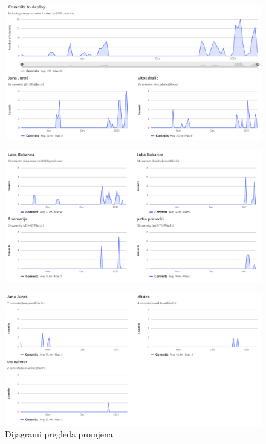 		\begin{figure}[H]
			\hspace*{-0.54in}
			\includegraphics[scale=0.43]{dijagrami/Dijagram pregleda promjena1.png}
			\label{fig:Dijagram pregleda promjena 1}
			\centering
		\end{figure}
	
		\begin{figure}[H]
			\hspace*{-0.54in}
			\includegraphics[scale=0.43]{dijagrami/Dijagram pregleda promjena2.1.png}
			\label{fig:Dijagram pregleda promjena 2}
			\centering
		\end{figure}
		
		\begin{figure}[H]
			\hspace*{-0.54in}
			\includegraphics[scale=0.43]{dijagrami/Dijagram pregleda promjena2.png}
			\caption{Dijagrami pregleda promjena}
			\label{fig:Dijagram pregleda promjena 3}
			\centering
		\end{figure}
		